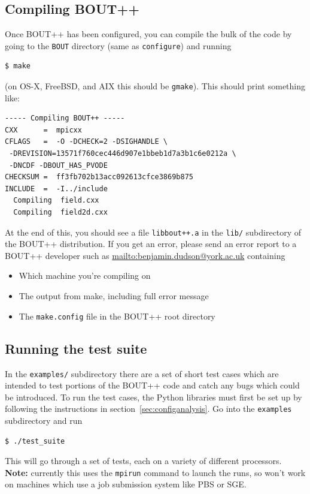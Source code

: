 \documentclass[12pt]{article}
\begin{document}
\subsection{Compiling BOUT++}
%
\label{sec:installbout}
%
Once BOUT++ has been configured, you can compile the bulk of the code by going
to the \texttt{BOUT} directory (same as \texttt{configure}) and running
%
\begin{verbatim}
$ make
\end{verbatim}
%
(on OS-X, FreeBSD, and AIX this should be \texttt{gmake}). This should print
something like:
%
\begin{verbatim}
----- Compiling BOUT++ -----
CXX      =  mpicxx
CFLAGS   =  -O -DCHECK=2 -DSIGHANDLE \
 -DREVISION=13571f760cec446d907e1bbeb1d7a3b1c6e0212a \
 -DNCDF -DBOUT_HAS_PVODE
CHECKSUM =  ff3fb702b13acc092613cfce3869b875
INCLUDE  =  -I../include
  Compiling  field.cxx
  Compiling  field2d.cxx
\end{verbatim}
%
At the end of this, you should see a file \texttt{libbout++.a} in the
\texttt{lib/} subdirectory of the BOUT++ distribution. If you get an error,
please send an error report to a BOUT++ developer such as
\url{mailto:benjamin.dudson@york.ac.uk} containing
%
\begin{itemize}
\item Which machine you're compiling on
\item The output from make, including full error message
\item The \texttt{make.config} file in the BOUT++ root directory
\end{itemize}
%



\subsection{Running the test suite}
%
\label{sec:runtestsuite}
%
In the \texttt{examples/} subdirectory there are a set of short test cases
which are intended to test portions of the BOUT++ code and catch any bugs which
could be introduced. To run the test cases, the Python libraries must first be
set up by following the instructions in section~\ref{sec:configanalysis}.  Go
into the \texttt{examples} subdirectory and run
%
\begin{verbatim}
$ ./test_suite
\end{verbatim}
%
This will go through a set of tests, each on a variety of different processors.
{\bf Note:} currently this uses the \texttt{mpirun} command to launch the runs,
so won't work on machines which use a job submission system like PBS or SGE.
\end{document}
